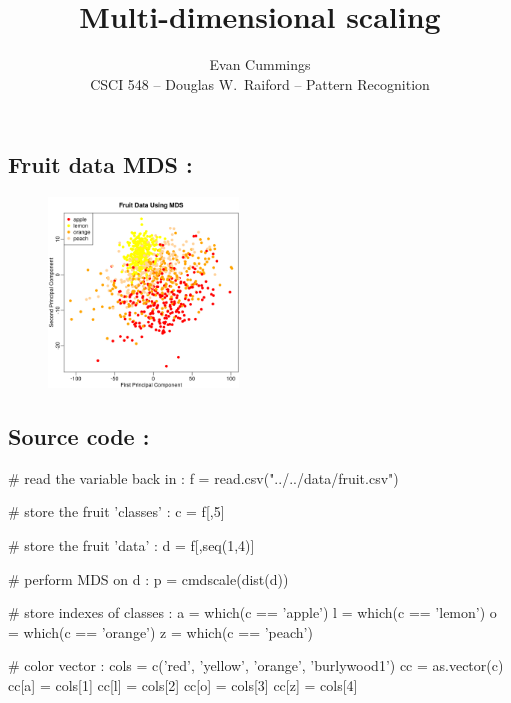 


\footnotesize

\title{Multi-dimensional scaling}
\author{Evan Cummings\\
CSCI 548 -- Douglas W.~Raiford -- Pattern Recognition}

\maketitle
\begin{multicols*}{2}

\section{Fruit data MDS :}

\begin{figure}[H]
  \centering
    \includegraphics[width=0.45\textwidth]{images/mds_plot_fruit.png}
\end{figure}

\subsection{Source code :}

\begin{Rs}
# read the variable back in :
f = read.csv("../../data/fruit.csv")

# store the fruit 'classes' :
c = f[,5]

# store the fruit 'data' :
d = f[,seq(1,4)]

# perform MDS on d :
p = cmdscale(dist(d))

# store indexes of classes :
a = which(c == 'apple')
l = which(c == 'lemon')
o = which(c == 'orange')
z = which(c == 'peach')

# color vector :
cols  = c('red', 'yellow', 'orange', 'burlywood1')
cc    = as.vector(c)
cc[a] = cols[1]
cc[l] = cols[2]
cc[o] = cols[3]
cc[z] = cols[4]


\end{Rs}
\end{multicols*}
